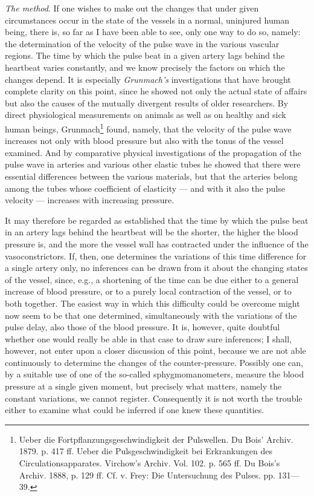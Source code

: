 \documentclass[12pt,a4paper,openany]{book}
\newcommand{\opage}[1]{\marginnote{\footnotesize\textit{[#1]}}}
\begin{document}
\emph{The method}. If one wishes to make out the changes that under
given circumstances occur in the state of the vessels in a
normal, uninjured human being, there is, so far as I
have been able to see, only one way to do so, namely: the determination of
the velocity of the pulse wave in the various vascular regions. The
time by which the pulse beat in a given artery lags behind
the heartbeat varies constantly, and we know precisely the factors on which
the changes depend. It is especially
\textit{Grunmach's} investigations that have brought complete
clarity on this point, since he showed not only the actual
state of affairs but also the causes of the mutually divergent
results of older researchers. By direct physiological measurements
on animals as well as on healthy and sick human beings,
Grunmach\footnote[1]{Ueber die Fortpflanzungsgeschwindigkeit der Pulswellen. Du Bois' Archiv. 1879. p. 417 ff. Ueber die Pulsgeschwindigkeit bei Erkrankungen des Circulationsapparates. Virchow's Archiv. Vol. 102. p. 565 ff. Du Bois's Archiv. 1888, p. 129 ff. Cf. v. Frey: Die Untersuchung des Pulses. pp. 131---39.} found, namely, that the velocity of the pulse wave increases
not only with blood pressure but also with the tonus of the vessel
examined. And by comparative physical investigations
of the propagation of the pulse wave in arteries and various other
elastic tubes he showed that there were essential differences
between the various materials, but that the arteries belong among
the tubes whose coefficient of elasticity --- and with it also the pulse velocity
--- increases with increasing pressure.

\setcounter{footnote}{0}%
\opage{277}It may therefore be regarded as established that the time by which
the pulse beat in an artery lags behind the heartbeat will
be the shorter, the higher the blood pressure is, and the more the vessel wall
has contracted under the influence of the vasoconstrictors.
If, then, one determines the variations of this time difference
for a single artery only, no
inferences can be drawn from it about the changing states of the vessel,
since, e.g., a shortening of the time can be due either to a general
increase of blood pressure, or to a purely local contraction of the vessel,
or to both together. The easiest way
in which this difficulty could be overcome might
now seem to be that one determined, simultaneously with the variations of
the pulse delay, also those of the blood pressure. It is, however, quite
doubtful whether one would really be able in that case to
draw sure inferences; I shall, however, not enter upon a closer
discussion of this point, because we are not able continuously
to determine the changes of the counter-pressure. Possibly
one can, by a suitable use of one of the so-called
sphygmomanometers, measure the blood pressure at a single given moment,
but precisely what matters, namely the constant
variations, we cannot register. Consequently it is
not worth the trouble either to examine what could be inferred
if one knew these quantities.
\end{document}
